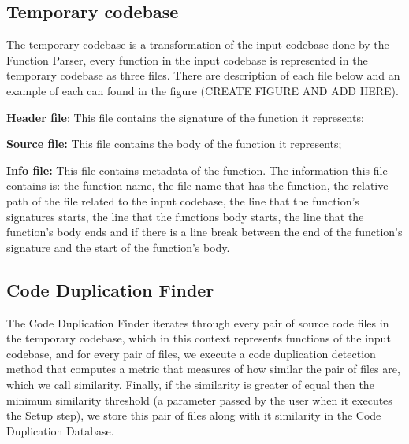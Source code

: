 \subsection{Temporary codebase}

The temporary codebase is a transformation of the input codebase done by the Function Parser, every function in the input codebase
is represented in the temporary codebase as three files. There are description of each file below and an example of each can found
in the figure (CREATE FIGURE AND ADD HERE).

\begin{itemize}
	\begin{item}
		\textbf{Header file}: This file contains the signature of the function it represents;
	\end{item}
	\begin{item}
		\textbf{Source file:} This file contains the body of the function it represents;
	\end{item}
	\begin{item}
		\textbf{Info file:} This file contains metadata of the function. The information this file contains is:
		the function name, the file name that has the function, the relative path of the file related to the input codebase, 
		the line that the function's signatures starts, the line that the functions body starts, the line that the function's body 
		ends and if there is a line break between the end of the function's signature and the start of the function's body.
		
	\end{item}
\end{itemize}

\subsection{Code Duplication Finder}

The Code Duplication Finder iterates through every pair of source code files in the temporary codebase, which in this context represents
functions of the input codebase, and for every pair of files, we execute a code duplication detection method that computes a metric
that measures of how similar the pair of files are, which we call similarity. Finally, if the similarity is greater of equal then the
minimum similarity threshold (a parameter passed by the user when it executes the Setup step), we store this pair of files along with
it similarity in the Code Duplication Database.

